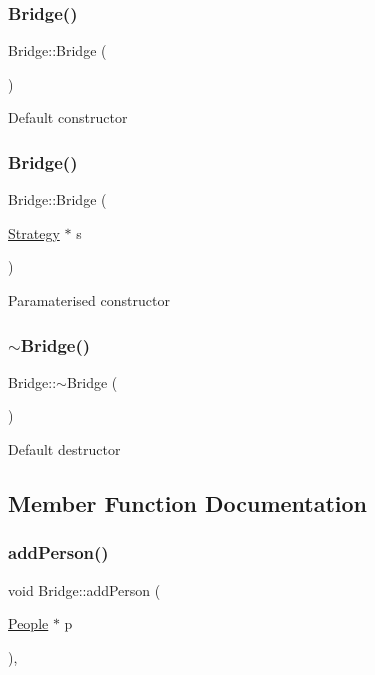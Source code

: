 \subsubsection{\texorpdfstring{Bridge()}{Bridge()}\hspace{0.1cm}{\footnotesize\ttfamily [1/2]}}
{\footnotesize\ttfamily Bridge\+::\+Bridge (\begin{DoxyParamCaption}{ }\end{DoxyParamCaption})}

Default constructor \mbox{\label{classBridge_a31994152fc209370604140c3591339c9}} 
\subsubsection{\texorpdfstring{Bridge()}{Bridge()}\hspace{0.1cm}{\footnotesize\ttfamily [2/2]}}
{\footnotesize\ttfamily Bridge\+::\+Bridge (\begin{DoxyParamCaption}\item[{\hyperlink{classStrategy}{Strategy} $\ast$}]{s }\end{DoxyParamCaption})}

Paramaterised constructor \mbox{\label{classBridge_a812b325fbb4f4b589e68f11f443a7ee4}} 
\subsubsection{\texorpdfstring{$\sim$\+Bridge()}{~Bridge()}}
{\footnotesize\ttfamily Bridge\+::$\sim$\+Bridge (\begin{DoxyParamCaption}{ }\end{DoxyParamCaption})}

Default destructor 

\subsection{Member Function Documentation}
\mbox{\label{classBridge_aec10bfb9af885933640548b509144a29}} 
\subsubsection{\texorpdfstring{add\+Person()}{addPerson()}}
{\footnotesize\ttfamily void Bridge\+::add\+Person (\begin{DoxyParamCaption}\item[{\hyperlink{classPeople}{People} $\ast$}]{p }\end{DoxyParamCaption})\hspace{0.3cm}{\ttfamily [inline]}, {\ttfamily [virtual]}}

